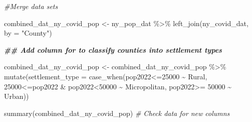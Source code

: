 \documentclass[
  12pt,
]{article}
\newenvironment{Shaded}{\begin{snugshade}}{\end{snugshade}}
\newcommand{\AttributeTok}[1]{\textcolor[rgb]{0.77,0.63,0.00}{#1}}
\newcommand{\CommentTok}[1]{\textcolor[rgb]{0.56,0.35,0.01}{\textit{#1}}}
\newcommand{\DecValTok}[1]{\textcolor[rgb]{0.00,0.00,0.81}{#1}}
\newcommand{\DocumentationTok}[1]{\textcolor[rgb]{0.56,0.35,0.01}{\textbf{\textit{#1}}}}
\newcommand{\FunctionTok}[1]{\textcolor[rgb]{0.00,0.00,0.00}{#1}}
\newcommand{\NormalTok}[1]{#1}
\newcommand{\OtherTok}[1]{\textcolor[rgb]{0.56,0.35,0.01}{#1}}
\newcommand{\SpecialCharTok}[1]{\textcolor[rgb]{0.00,0.00,0.00}{#1}}
\newcommand{\StringTok}[1]{\textcolor[rgb]{0.31,0.60,0.02}{#1}}
\begin{document}
\begin{Shaded}
\begin{Highlighting}[]
\CommentTok{\#Merge data sets}

\NormalTok{combined\_dat\_ny\_covid\_pop }\OtherTok{\textless{}{-}}\NormalTok{ ny\_pop\_dat }\SpecialCharTok{\%\textgreater{}\%} 
  \FunctionTok{left\_join}\NormalTok{(ny\_covid\_dat, }\AttributeTok{by =} \StringTok{"County"}\NormalTok{)}

\DocumentationTok{\#\# Add column for to classify counties into settlement types}

\NormalTok{combined\_dat\_ny\_covid\_pop }\OtherTok{\textless{}{-}}\NormalTok{ combined\_dat\_ny\_covid\_pop }\SpecialCharTok{\%\textgreater{}\%}
  \FunctionTok{mutate}\NormalTok{(}\AttributeTok{settlement\_type =} \FunctionTok{case\_when}\NormalTok{(pop2022}\SpecialCharTok{\textless{}=}\DecValTok{25000} \SpecialCharTok{\textasciitilde{}} \StringTok{\textquotesingle{}Rural\textquotesingle{}}\NormalTok{,}
                                     \DecValTok{25000}\SpecialCharTok{\textless{}=}\NormalTok{pop2022 }\SpecialCharTok{\&}\NormalTok{ pop2022}\SpecialCharTok{\textless{}}\DecValTok{50000} \SpecialCharTok{\textasciitilde{}} \StringTok{\textquotesingle{}Micropolitan\textquotesingle{}}\NormalTok{,}
\NormalTok{                                     pop2022}\SpecialCharTok{\textgreater{}=} \DecValTok{50000} \SpecialCharTok{\textasciitilde{}} \StringTok{\textquotesingle{}Urban\textquotesingle{}}\NormalTok{))}

\FunctionTok{summary}\NormalTok{(combined\_dat\_ny\_covid\_pop) }\CommentTok{\# Check data for new columns}
\end{Highlighting}
\end{Shaded}
\end{document}
